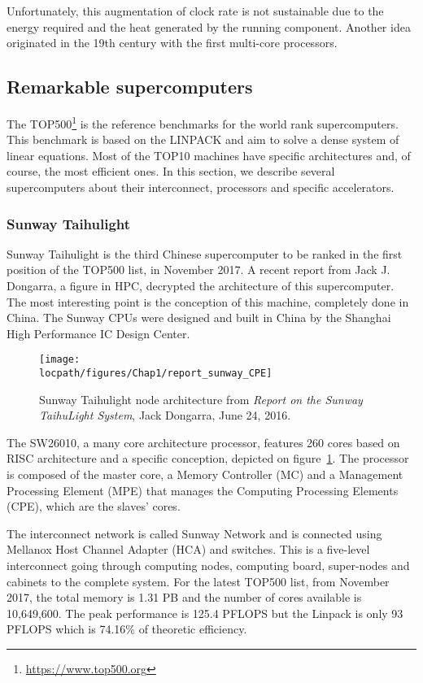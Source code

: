 Unfortunately, this augmentation of clock rate is not sustainable due to the energy required and the heat generated by the running component. 
Another idea originated in the 19th century with the first multi-core processors. 


\subsection{Remarkable supercomputers}
The TOP500\footnote{\url{https://www.top500.org}} is the reference benchmarks for the world rank supercomputers. 
This benchmark is based on the LINPACK and aim to solve a dense system of linear equations.
Most of the TOP10 machines have specific architectures and, of course, the most efficient ones. 
In this section, we describe several supercomputers about their interconnect, processors and specific accelerators. 

\subsubsection{Sunway Taihulight}
Sunway Taihulight is the third Chinese supercomputer to be ranked in the first position of the TOP500 list, in November 2017. 
A recent report from Jack J. Dongarra, a figure in HPC, decrypted the architecture of this supercomputer\cite{dongarra2016report}. 
The most interesting point is the conception of this machine, completely done in China. 
The Sunway CPUs were designed and built in China by the Shanghai High Performance IC Design Center. 

\begin{figure}[t!]
\centering
\texttt{[image: \\locpath/figures/Chap1/report\_sunway\_CPE]}
\caption[Sunway Tahulight node architecture]{Sunway Taihulight node architecture from \textit{Report on the Sunway TaihuLight System}, Jack Dongarra, June 24, 2016.}
\label{fig:chap1_report_sunway_CPE}
\end{figure}

The SW26010, a many core architecture processor, features 260 cores based on RISC architecture and a specific conception, depicted on figure~\ref{fig:chap1_report_sunway_CPE}. 
The processor is composed of the master core, a Memory Controller (MC) and a Management Processing Element (MPE) that manages the Computing Processing Elements (CPE), which are the slaves’ cores. 

The interconnect network is called Sunway Network and is connected using Mellanox Host Channel Adapter (HCA) and switches. 
This is a five-level interconnect going through computing nodes, computing board, super-nodes and cabinets to the complete system.
For the latest TOP500 list, from November 2017, the total memory is 1.31 PB and the number of cores available is 10,649,600.
The peak performance is 125.4 PFLOPS but the Linpack is only 93 PFLOPS which is 74.16\% of theoretic efficiency. 

